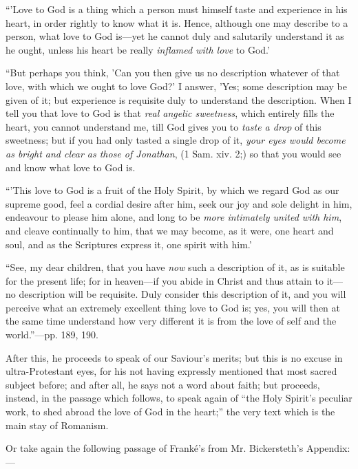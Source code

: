 ``'Love to God
is a thing which a person must himself taste and experience in his
heart, in order rightly to know what it is. Hence, although one may
describe to a person, what love to God is—yet he cannot duly and
salutarily understand it as he ought, unless his heart be really \emph{inflamed
with love} to God.'

``But perhaps you think, 'Can you
then give us no description whatever of that love, with which we ought
to love God?' I answer, 'Yes; some description may be given of it; but
experience is requisite duly to understand the description. When I tell
you that love to God is that \emph{real angelic sweetness}, which
entirely fills the heart, you cannot understand me, till God gives you
to \emph{taste a drop} of this sweetness; but if you had only tasted a
single drop of it, \emph{your eyes would become as bright and clear as
those of Jonathan}, (1 Sam. xiv. 2;) so that you would see and know
what love to God is.

``'This love to God is a fruit of the
Holy Spirit, by which we regard God as our supreme good, feel a cordial
desire after him, seek our joy and sole delight in him, endeavour to
please him alone, and long to be \emph{more intimately united with him},
and cleave continually to him, that we may become, as it were, one heart
and soul, and as the Scriptures express it, one spirit with him.'

``See, my dear children, that you
have \emph{now} such a description of it, as is suitable for the present
life; for in heaven—if you abide in Christ and thus attain to it—no
description will be requisite. Duly consider this description of it, and
you will perceive what an extremely excellent thing love to God is; yes,
you will then at the same time understand how very different it is from
the love of self and the world.''—pp. 189, 190.

After this, he proceeds to speak of our Saviour's
merits; but this is no excuse in ultra-Protestant eyes, for his not
having expressly mentioned that most sacred subject before; and after
all, he says not a word about faith; but proceeds, instead, in the
passage which follows, to speak again of ``the Holy Spirit's peculiar
work, to shed abroad the love of God in the heart;'' the very text which
is the main stay of Romanism.

Or take again the following passage of Franké's
from Mr. Bickersteth's Appendix:—

